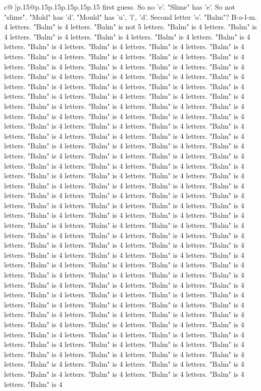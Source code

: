 \documentclass{article}
\begin{document}
{\begin{supertabular}{c@{$\;$}|p{.15\linewidth}@{}p{.15\linewidth}p{.15\linewidth}p{.15\linewidth}p{.15\linewidth}p{.15\linewidth}}
{{{first guess. So no 'e'. "Slime" has 'e'. So not "slime". "Mold" has 'd'. "Mould" has 'u', 'l', 'd'. Second letter 'o'. "Balm"? B{-}a{-}l{-}m. 4 letters. "Balm" is 4 letters. "Balm" is not 5 letters. "Balm" is 4 letters. "Balm" is 4 letters. "Balm" is 4 letters. "Balm" is 4 letters. "Balm" is 4 letters. "Balm" is 4 letters. "Balm" is 4 letters. "Balm" is 4 letters. "Balm" is 4 letters. "Balm" is 4 letters. "Balm" is 4 letters. "Balm" is 4 letters. "Balm" is 4 letters. "Balm" is 4 letters. "Balm" is 4 letters. "Balm" is 4 letters. "Balm" is 4 letters. "Balm" is 4 letters. "Balm" is 4 letters. "Balm" is 4 letters. "Balm" is 4 letters. "Balm" is 4 letters. "Balm" is 4 letters. "Balm" is 4 letters. "Balm" is 4 letters. "Balm" is 4 letters. "Balm" is 4 letters. "Balm" is 4 letters. "Balm" is 4 letters. "Balm" is 4 letters. "Balm" is 4 letters. "Balm" is 4 letters. "Balm" is 4 letters. "Balm" is 4 letters. "Balm" is 4 letters. "Balm" is 4 letters. "Balm" is 4 letters. "Balm" is 4 letters. "Balm" is 4 letters. "Balm" is 4 letters. "Balm" is 4 letters. "Balm" is 4 letters. "Balm" is 4 letters. "Balm" is 4 letters. "Balm" is 4 letters. "Balm" is 4 letters. "Balm" is 4 letters. "Balm" is 4 letters. "Balm" is 4 letters. "Balm" is 4 letters. "Balm" is 4 letters. "Balm" is 4 letters. "Balm" is 4 letters. "Balm" is 4 letters. "Balm" is 4 letters. "Balm" is 4 letters. "Balm" is 4 letters. "Balm" is 4 letters. "Balm" is 4 letters. "Balm" is 4 letters. "Balm" is 4 letters. "Balm" is 4 letters. "Balm" is 4 letters. "Balm" is 4 letters. "Balm" is 4 letters. "Balm" is 4 letters. "Balm" is 4 letters. "Balm" is 4 letters. "Balm" is 4 letters. "Balm" is 4 letters. "Balm" is 4 letters. "Balm" is 4 letters. "Balm" is 4 letters. "Balm" is 4 letters. "Balm" is 4 letters. "Balm" is 4 letters. "Balm" is 4 letters. "Balm" is 4 letters. "Balm" is 4 letters. "Balm" is 4 letters. "Balm" is 4 letters. "Balm" is 4 letters. "Balm" is 4 letters. "Balm" is 4 letters. "Balm" is 4 letters. "Balm" is 4 letters. "Balm" is 4 letters. "Balm" is 4 letters. "Balm" is 4 letters. "Balm" is 4 letters. "Balm" is 4 letters. "Balm" is 4 letters. "Balm" is 4 letters. "Balm" is 4 letters. "Balm" is 4 letters. "Balm" is 4 letters. "Balm" is 4 letters. "Balm" is 4 letters. "Balm" is 4 letters. "Balm" is 4 letters. "Balm" is 4 letters. "Balm" is 4 letters. "Balm" is 4 letters. "Balm" is 4 letters. "Balm" is 4 letters. "Balm" is 4 letters. "Balm" is 4 letters. "Balm" is 4 letters. "Balm" is 4 letters. "Balm" is 4 letters. "Balm" is 4 letters. "Balm" is 4 letters. "Balm" is 4 letters. "Balm" is 4 letters. "Balm" is 4 letters. "Balm" is 4 letters. "Balm" is 4 letters. "Balm" is 4 letters. "Balm" is 4 letters. "Balm" is 4 letters. "Balm" is 4 letters. "Balm" is 4 letters. "Balm" is 4 letters. "Balm" is 4 letters. "Balm" is 4 letters. "Balm" is 4 letters. "Balm" is 4 letters. "Balm" is 4 letters. "Balm" is 4 letters. "Balm" is 4 letters. "Balm" is 4 letters. "Balm" is 4 letters. "Balm" is 4 letters. "Balm" is 4 letters. "Balm" is 4 letters. "Balm" is 4 letters. "Balm" is 4 letters. "Balm" is 4 letters. "Balm" is 4 letters. "Balm" is 4 letters. "Balm" is 4 letters. "Balm" is 4 letters. "Balm" is 4 }}}
\end{supertabular}}
\end{document}

